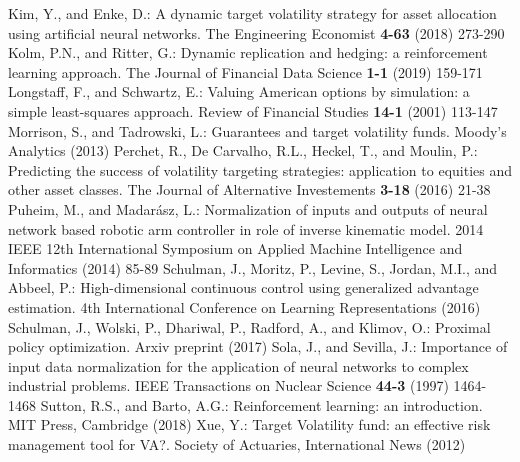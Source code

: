 \documentclass[runningheads]{m2ef}
\begin{document}
\begin{thebibliography}{99}
%
Kim, Y., and Enke, D.: A dynamic target volatility strategy for asset allocation using artificial neural networks. The Engineering Economist {\bf 4-63} (2018) 273-290
%
Kolm, P.N., and Ritter, G.: Dynamic replication and hedging: a reinforcement learning approach. The Journal of Financial Data Science {\bf 1-1} (2019) 159-171
%
Longstaff, F., and Schwartz, E.: Valuing American options by simulation: a simple least-squares approach. Review of Financial Studies {\bf 14-1} (2001) 113-147
%
Morrison, S., and Tadrowski, L.: Guarantees and target volatility funds. Moody's Analytics (2013)
%
Perchet, R., De Carvalho, R.L., Heckel, T., and Moulin, P.: Predicting the success of volatility targeting strategies: application to equities and other asset classes. The Journal of Alternative Investements {\bf 3-18} (2016) 21-38
%
Puheim, M., and Madar\'{a}sz, L.: Normalization of inputs and outputs of neural network based robotic arm controller in role of inverse kinematic model. 2014 IEEE 12th International Symposium on Applied Machine Intelligence and Informatics (2014) 85-89
%
Schulman, J., Moritz, P., Levine, S., Jordan, M.I., and Abbeel, P.: High-dimensional continuous control using generalized advantage estimation. 4th International Conference on Learning Representations (2016)
%
Schulman, J.,  Wolski, P., Dhariwal, P., Radford, A., and Klimov, O.: Proximal policy optimization. Arxiv preprint (2017)
%
Sola, J., and Sevilla, J.: Importance of input data normalization for the application of neural networks to complex industrial problems. IEEE Transactions on Nuclear Science {\bf 44-3} (1997) 1464-1468
%
Sutton, R.S., and Barto, A.G.: Reinforcement learning: an introduction. MIT Press, Cambridge (2018)
%
Xue, Y.: Target Volatility fund: an effective risk management tool for VA?. Society of Actuaries, International News (2012)
\end{thebibliography}

\vfill

\footnotesize{\vskip1mm$\!\!\!\!\!\!\!\!\!\!${}}

\end{document}
